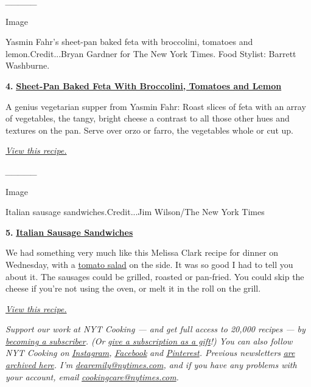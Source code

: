 \emph{\_\_\_\_\_}

Image

Yasmin Fahr's sheet-pan baked feta with broccolini, tomatoes and
lemon.Credit...Bryan Gardner for The New York Times. Food Stylist:
Barrett Washburne.

\textbf{4.}
\href{https://cooking.nytimes.com/recipes/1021277-sheet-pan-baked-feta-with-broccolini-tomatoes-and-lemon}{\textbf{Sheet-Pan
Baked Feta With Broccolini, Tomatoes and Lemon}}

A genius vegetarian supper from Yasmin Fahr: Roast slices of feta with
an array of vegetables, the tangy, bright cheese a contrast to all those
other hues and textures on the pan. Serve over orzo or farro, the
vegetables whole or cut up.

\href{https://cooking.nytimes.com/recipes/1021277-sheet-pan-baked-feta-with-broccolini-tomatoes-and-lemon}{\emph{View
this recipe.}}

\emph{\_\_\_\_\_}

Image

Italian sausage sandwiches.Credit...Jim Wilson/The New York Times

\textbf{5.}
\href{https://cooking.nytimes.com/recipes/1013191-italian-sausage-sandwiches}{\textbf{Italian
Sausage Sandwiches}}

We had something very much like this Melissa Clark recipe for dinner on
Wednesday, with a
\href{https://cooking.nytimes.com/recipes/1014851-tomato-and-watermelon-salad}{tomato
salad} on the side. It was so good I had to tell you about it. The
sausages could be grilled, roasted or pan-fried. You could skip the
cheese if you're not using the oven, or melt it in the roll on the
grill.

\href{https://cooking.nytimes.com/recipes/1013191-italian-sausage-sandwiches}{\emph{View
this recipe.}}

\emph{Support our work at NYT Cooking --- and get full access to 20,000
recipes --- by}
\href{https://www.nytimes.com/subscription/cooking.html?campaignId=788FJ}{\emph{becoming
a subscriber}}\emph{. (Or}
\href{https://www.nytimes.com/subscriptions/Multiproduct/cooking_gift.html?campaignId=78X7R}{\emph{give
a subscription as a gift}}\emph{!) You can also follow NYT Cooking on}
\href{https://www.instagram.com/nytcooking}{\emph{Instagram}}\emph{,}
\href{https://www.facebook.com/nytcooking/}{\emph{Facebook}} \emph{and}
\href{https://www.pinterest.com/nytcooking/}{\emph{Pinterest}}\emph{.
Previous newsletters}
\href{https://www.nytimes.com/column/five-weeknight-dishes}{\emph{are
archived here}}\emph{. I'm}
\href{mailto:dearemily@nytimes.com}{\emph{dearemily@nytimes.com}}\emph{,
and if you have any problems with your account, email}
\href{mailto:cookingcare@nytimes.com}{\emph{cookingcare@nytimes.com}}\emph{.}

